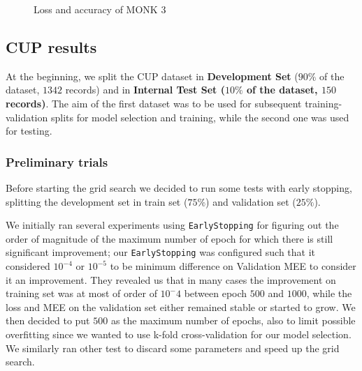 \begin{figure}
    \centering
    \caption{Loss and accuracy of MONK 3}
    \label{fig:monk3}
\end{figure}

\subsection{CUP results}

At the beginning, we split the CUP dataset in \textbf{Development Set} ($90\%$ of the dataset, $1342$ records) and in  \textbf{Internal Test Set ($10\%$ of the dataset, $150$ records)}. The aim of the first dataset was to be used for subsequent training-validation splits for model selection and training, while the second one was used for testing.

\subsubsection{Preliminary trials}

Before starting the grid search we decided to run some tests with early stopping, splitting the development set in train set ($75\%$) and validation set ($25\%$).

We initially ran several experiments using \texttt{EarlyStopping} for figuring out the order of magnitude of the maximum number of epoch for which there is still significant improvement; our \texttt{EarlyStopping} was configured such that it considered $10^{-4}$ or $10^{-5}$ to be minimum difference on Validation MEE to consider it an improvement. They revealed us that in many cases the improvement on training set was at most of order of $10^-4$ between epoch $500$ and $1000$, while the loss and MEE on the validation set either remained stable or started to grow. We then decided to put $500$ as the maximum number of epochs, also to limit possible overfitting since we wanted to use k-fold cross-validation for our model selection. We similarly ran other test to discard some parameters and speed up the grid search. 

